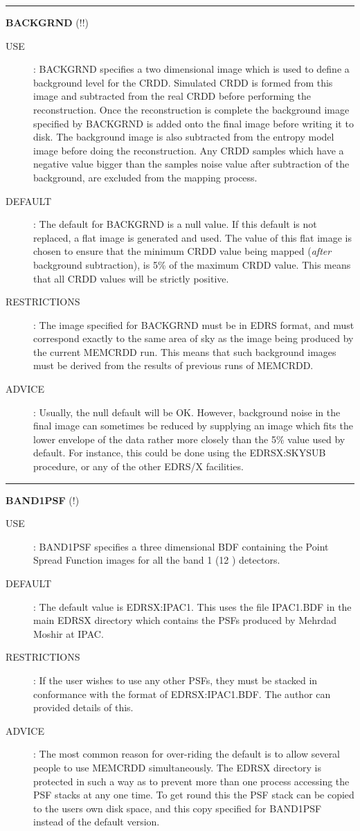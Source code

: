 \rule{\textwidth}{0.3mm}
{\Large {\bf BACKGRND} (!!)}
\begin{description}
\item [USE]:
BACKGRND specifies a two dimensional image which is used to define a background 
level for the CRDD. Simulated CRDD is formed from this image and subtracted from
the real CRDD before performing the reconstruction. Once the reconstruction is
complete the background image specified by BACKGRND is added onto the final
image before writing it to disk. The background image is also subtracted from 
the entropy model image before doing the reconstruction. Any CRDD samples which
have a negative value bigger than the samples noise value after 
subtraction of the background, are excluded from the mapping process.
\item [DEFAULT]:
The default for BACKGRND is a null value. If this default is not replaced, 
a flat image is generated and used. The value of this flat image is chosen to
ensure that the minimum CRDD value being mapped ({\em after} background
subtraction), is 5\% of the maximum CRDD value. This means that all CRDD values
will be strictly positive. 
\item [RESTRICTIONS]:
The image specified for BACKGRND must be in EDRS format, and must correspond 
exactly to the same area of sky as the image being produced by the current
MEMCRDD run. This means that such background images must be derived
from the results of previous runs of MEMCRDD. 
\item [ADVICE]: 
Usually, the null default will be OK. However, background noise in the final
image can sometimes be reduced by supplying an image which fits the lower
envelope of the data rather more closely than the 5\% value used by default.
For instance, this could be done using the EDRSX:SKYSUB procedure, or any of 
the other EDRS/X facilities.
\end {description}

\rule{\textwidth}{0.3mm}
{\Large {\bf BAND1PSF} (!)}
\begin{description}
\item [USE]:
BAND1PSF specifies a three dimensional BDF containing the Point Spread Function
images for all the band 1 (12 \micron) detectors.
\item [DEFAULT]:
The default value is EDRSX:IPAC1. This uses the file IPAC1.BDF in the main
EDRSX directory which contains the PSFs produced by Mehrdad Moshir at IPAC.
\item [RESTRICTIONS]:
If the user wishes to use any other PSFs, they must be stacked in conformance 
with the format of EDRSX:IPAC1.BDF. The author can provided details of this.
\item [ADVICE]:
The most common reason for over-riding the default is to allow several people
to use MEMCRDD simultaneously. The EDRSX directory is protected in such a way as
to prevent more than one process accessing the PSF stacks at any one time. To
get round this the PSF stack can be copied to the users own disk space, and this
copy specified for BAND1PSF instead of the default version. 
\end {description}


